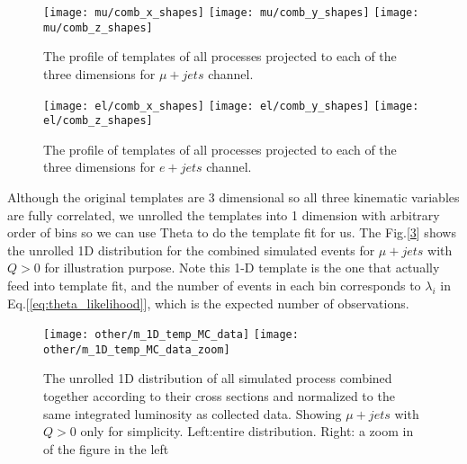 \begin{figure}[hbt]
  \begin{center}
    \texttt{[image: mu/comb\_x\_shapes]}
    \texttt{[image: mu/comb\_y\_shapes]}
    \texttt{[image: mu/comb\_z\_shapes]}
    
  \caption{\small The profile of templates of all processes projected to each of the three dimensions for $\mu+jets$ channel.}
    \label{fig:template_shapes_mu}
  \end{center}
\end{figure}

\begin{figure}[hbt]
  \begin{center}
    \texttt{[image: el/comb\_x\_shapes]}
    \texttt{[image: el/comb\_y\_shapes]}
    \texttt{[image: el/comb\_z\_shapes]}
    
  \caption{\small The profile of templates of all processes projected to each of the three dimensions for $e+jets$ channel.}
    \label{fig:template_shapes_el}
  \end{center}
\end{figure}


Although the original templates are 3 dimensional so  all three kinematic variables are fully correlated, we unrolled the templates into 1 dimension with arbitrary order of bins so we can use Theta to do the template fit for us. The Fig.[\ref{fig:1D template}] shows the unrolled 1D distribution for the combined simulated events for $\mu+jets$ with $Q>0$ for illustration purpose. Note this 1-D template is the one that actually feed into template fit, and the number of events in each bin corresponds to $\lambda_i$ in Eq.[\ref{eq:theta_likelihood}], which is the expected number of observations. 

\begin{figure}[hbt]
  \begin{center}
    \texttt{[image: other/m\_1D\_temp\_MC\_data]}
    \texttt{[image: other/m\_1D\_temp\_MC\_data\_zoom]}
    
  \caption{\small The unrolled 1D distribution of all simulated process combined together according to their cross sections and normalized to the same integrated luminosity as collected data. Showing $\mu + jets$ with $Q>0$ only for simplicity. Left:entire distribution. Right: a zoom in of the figure in the left }
    \label{fig:1D template}
  \end{center}
\end{figure}


